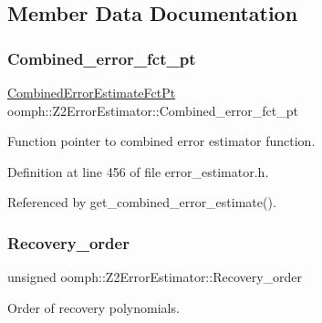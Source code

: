 \subsection{Member Data Documentation}
\mbox{\label{classoomph_1_1Z2ErrorEstimator_a34a013732989e82f50cb7e72f25632a7}} 
\subsubsection{\texorpdfstring{Combined\+\_\+error\+\_\+fct\+\_\+pt}{Combined\_error\_fct\_pt}}
{\footnotesize\ttfamily \hyperlink{classoomph_1_1Z2ErrorEstimator_a75ef55e67b21ec49ed1a37d095cfa9f9}{Combined\+Error\+Estimate\+Fct\+Pt} oomph\+::\+Z2\+Error\+Estimator\+::\+Combined\+\_\+error\+\_\+fct\+\_\+pt\hspace{0.3cm}{\ttfamily [private]}}



Function pointer to combined error estimator function. 



Definition at line 456 of file error\+\_\+estimator.\+h.



Referenced by get\+\_\+combined\+\_\+error\+\_\+estimate().

\mbox{\label{classoomph_1_1Z2ErrorEstimator_a9aafff3d80518811ba7d9bb12a240a7c}} 
\subsubsection{\texorpdfstring{Recovery\+\_\+order}{Recovery\_order}}
{\footnotesize\ttfamily unsigned oomph\+::\+Z2\+Error\+Estimator\+::\+Recovery\+\_\+order\hspace{0.3cm}{\ttfamily [private]}}



Order of recovery polynomials. 



